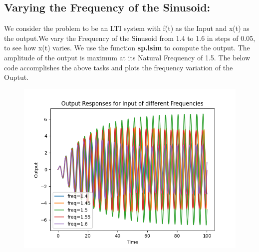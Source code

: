 \documentclass[12pt, a4paper]{report}
\begin{document}
\subsection{Varying the Frequency of the Sinusoid:}
We consider the problem to be an LTI system with f(t) as the Input and x(t) as the output.We vary the Frequency of the Sinusoid from 1.4 to 1.6 in steps of 0.05, to see how x(t) varies. We use the function \textbf{sp.lsim} to compute the output. The amplitude of the output is maximum at its Natural Frequency of 1.5. The below code accomplishes the above tasks and plots the frequency variation of the Ouptut.
\noindent

\begin{figure}[h!]
    \centering
    \includegraphics[scale=0.75]{fig3.png} 
    \caption{}
    \label{fig:my_label}
\end{figure}
\end{document}
